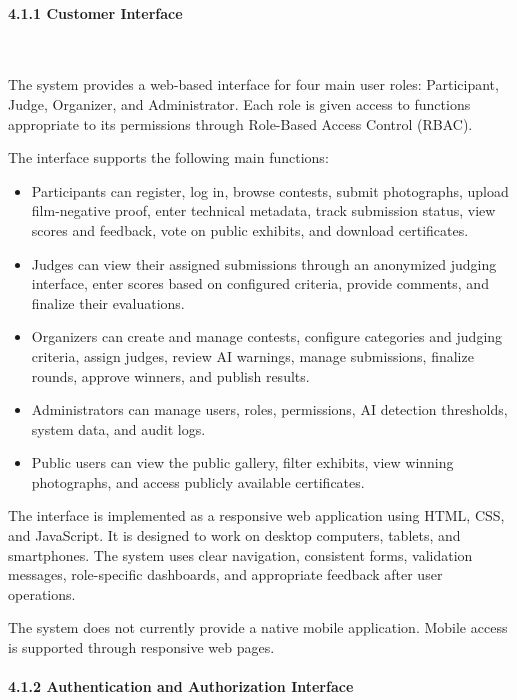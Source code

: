 \paragraph*{4.1.1 Customer Interface}\leavevmode\\[-0.5em]
\label{par:customer-interface}

The system provides a web-based interface for four main user roles: Participant, Judge, Organizer, and Administrator. Each role is given access to functions appropriate to its permissions through Role-Based Access Control (RBAC).

The interface supports the following main functions:

\begin{itemize}[leftmargin=1.5em, nosep]
    \item Participants can register, log in, browse contests, submit photographs, upload film-negative proof, enter technical metadata, track submission status, view scores and feedback, vote on public exhibits, and download certificates.
    \item Judges can view their assigned submissions through an anonymized judging interface, enter scores based on configured criteria, provide comments, and finalize their evaluations.
    \item Organizers can create and manage contests, configure categories and judging criteria, assign judges, review AI warnings, manage submissions, finalize rounds, approve winners, and publish results.
    \item Administrators can manage users, roles, permissions, AI detection thresholds, system data, and audit logs.
    \item Public users can view the public gallery, filter exhibits, view winning photographs, and access publicly available certificates.
\end{itemize}

The interface is implemented as a responsive web application using HTML, CSS, and JavaScript. It is designed to work on desktop computers, tablets, and smartphones. The system uses clear navigation, consistent forms, validation messages, role-specific dashboards, and appropriate feedback after user operations.

The system does not currently provide a native mobile application. Mobile access is supported through responsive web pages.

\paragraph*{4.1.2 Authentication and Authorization Interface}\leavevmode\\[-0.5em]
\label{par:authentication-authorization-interface}

